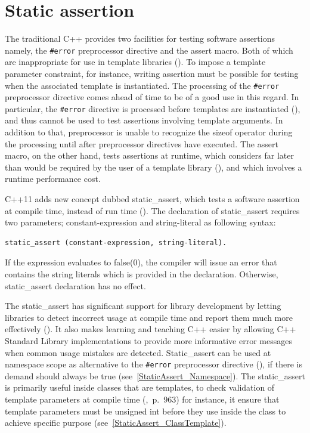 \documentclass[11pt]{report}
\begin{document}
\section{Static assertion}
\label{section: Static assertion}
The traditional C++ provides two facilities for testing software assertions namely, the \texttt{\#error} preprocessor directive and the assert macro. Both of which are inappropriate for use in template libraries (\cite{Stroustrup:2012:Cpp11}). To impose a template parameter constraint, for instance, writing assertion must be possible for testing when the associated template is instantiated. The processing of the \texttt{\#error} preprocessor directive comes ahead of time to be of a good use in this regard. In particular, the \texttt{\#error} directive is processed before templates are instantiated (\cite{Stroustrup:2012:Cpp11}), and thus cannot be used to test assertions involving template arguments. In addition to that, preprocessor is unable to recognize the sizeof operator during the processing until after preprocessor directives have executed. The assert macro, on the other hand, tests assertions at runtime, which considers far later than would be required by the user of a template library (\cite{Stroustrup:2012:Cpp11}), and which involves a runtime performance cost.

C++11 adds new concept dubbed static\_assert, which tests a software assertion at compile time, instead of run time (\cite{MSDN:2012:CppModern}). The declaration of static\_assert requires two parameters; constant-expression and string-literal as following syntax:
\begin{lstlisting}
static_assert (constant-expression, string-literal).
\end{lstlisting}

If the expression evaluates to false(0), the compiler will issue an error that contains the string literals which is provided in the declaration. Otherwise, static\_assert declaration has no effect.

The static\_assert has significant support for library development by letting libraries to detect incorrect usage at compile time and report them much more effectively (\cite{MSDN:2012:CppModern}). It also makes learning and teaching C++ easier by allowing C++ Standard Library implementations to provide more informative error messages when common usage mistakes are detected. Static\_assert can be used at namespace scope as alternative to the \texttt{\#error} preprocessor directive (\cite{MSDN:2012:CppModern}), if there is demand should always be true (see~\ref{StaticAssert_Namespace}). The static\_assert is primarily useful inside classes that are templates, to check validation of template parameters at compile time (\cite{Deitel:2012:CPP},~p.~963) for instance, it ensure that template parameters must be unsigned int before they use inside the class  to achieve specific purpose (see~\ref{StaticAssert_ClassTemplate}).
\end{document}

